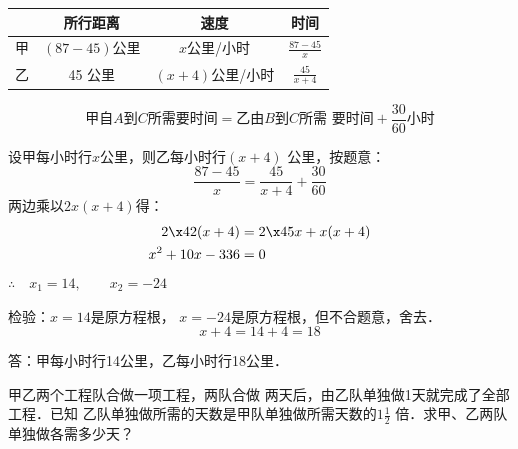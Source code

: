 \begin{analyze}
\begin{center}
\end{center}
\begin{center}
    \renewcommand{\arraystretch}{1.8}
\begin{tabular}{cccc}
    \hline
    & 所行距离 &  速度 & 时间\\
    \hline
    甲&    $(87-45)$公里&    $x$公里/小时   & $\frac{87-45}{x}$   \\
    乙& 45 公里&     $(x+4)$公里/小时&    $\frac{45}{x+4}$   \\
    \hline
\end{tabular}    
\end{center}

\[\text{甲自$A$到$C$所需要时间}=\text{乙由$B$到$C$所需
要时间}+\frac{30}{60}\text{小时}\]
\end{analyze}

\begin{solution}
    设甲每小时行$x$公里，则乙每小时行$(x+4)$
公里，按题意：
\[\frac{87-45}{x}=\frac{45}{x+4}+\frac{30}{60}  \]
两边乘以$2x(x+4)$得：
\[\begin{split}
    2\x 42(x+4) &=2\x 45x+x(x+4)\\
    x^2+10x-336&=0
\end{split}\]
$\therefore\quad x_1=14,\qquad x_2=-24$

检验：$x=14$是原方程根，
$x=-24$是原方程根，但不合题意，舍去．
\[x+4=14+4=18\]

答：甲每小时行14公里，乙每小时行18公里．
\end{solution}

\begin{example}
    甲乙两个工程队合做一项工程，两队合做
两天后，由乙队单独做1天就完成了全部工程．已知
乙队单独做所需的天数是甲队单独做所需天数的$1\frac{1}{2}$
倍．求甲、乙两队单独做各需多少天？
\end{example}

